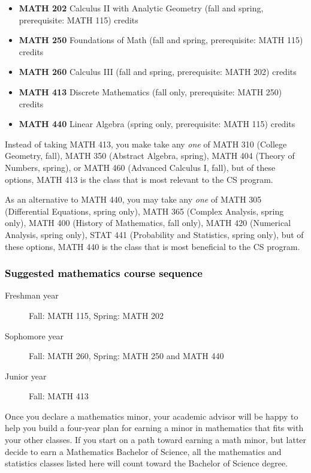 \documentclass[10pt]{article}
\newenvironment{mypar}[2]
   {\begin{list}{}%
     {\setlength\leftmargin{#1}
     \setlength\rightmargin{#2}}
     \item[]}
   {\end{list}}
\newcommand{\calctwo}{\textbf{MATH 202} Calculus II with Analytic Geometry (fall and spring, prerequisite: MATH 115) \dotfill 5 credits }
\newcommand{\foundations}{\textbf{MATH 250} Foundations of Math (fall and spring, prerequisite: MATH 115)  \dotfill 3 credits}
\newcommand{\calcthree}{\textbf{MATH 260} Calculus III  (fall and spring, prerequisite: MATH 202) \dotfill 5 credits}
\newcommand{\linear}{\textbf{MATH 440} Linear Algebra (spring only, prerequisite: MATH 115) \dotfill 3 credits}
\newcommand{\discrete}{\textbf{MATH 413} Discrete Mathematics  (fall only, prerequisite: MATH 250)\dotfill 3 credits}
\begin{document}
\begin{itemize}
\item \calctwo
\item \foundations
\item \calcthree
\item \discrete
\item \linear
\end{itemize}
\begin{mypar}{0.5cm}{0.5cm}{Instead of taking MATH 413, you make take any \emph{one} of MATH 310 (College Geometry, fall),  MATH 350 (Abstract Algebra, spring),  MATH 404  (Theory of Numbers, spring), or MATH 460 (Advanced Calculus I, fall), but of these options, MATH 413 is  the class that is most relevant to the CS program.

  \quad As an alternative to MATH 440, you may take any \emph{one} of
  MATH 305 (Differential Equations, spring only),
MATH 365 (Complex Analysis, spring only),
MATH 400 (History of Mathematics, fall only),
MATH 420 (Numerical Analysis, spring only),
STAT 441 (Probability and Statistics, spring only),
but of these options, MATH 440 is  the class that is most beneficial to the CS program.
}
\end{mypar}

\vspace{-0.1in}
\subsubsection*{\textcolor{black}{Suggested mathematics course sequence}}

\begin{description}
   \item[\phantom{xxx} Freshman year] Fall: MATH 115, Spring:  MATH 202
      \item[\phantom{xxx} Sophomore year]  Fall: MATH 260,  Spring: MATH 250  and MATH 440
     \item[\phantom{xxx} Junior year]  Fall: MATH 413
 \end{description}
Once you declare a mathematics minor, your academic advisor will be happy to help you build a four-year plan for earning a minor in mathematics that fits with your other classes.  If you start on a path toward earning a math minor, but latter decide to earn a  Mathematics Bachelor of Science, all the mathematics and statistics  classes listed here will count toward the Bachelor of Science degree.
\end{document}
